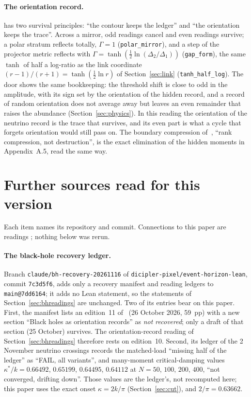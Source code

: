 \paragraph{The orientation record.} \cite{BH} has two survival principles: ``the contour keeps the ledger'' and ``the orientation keeps the trace''. Across a mirror, odd readings cancel and even readings survive; a polar stratum reflects totally, $\Gamma=1$ (\texttt{polar\_mirror}), and a step of the projector metric reflects with $\Gamma=\tanh(\tfrac12\ln(\Delta_2/\Delta_1))$ (\texttt{gap\_form}), the same $\tanh$ of half a log-ratio as the link coordinate $(r-1)/(r+1)=\tanh(\tfrac12\ln r)$ of Section~\ref{sec:link} (\texttt{tanh\_half\_log}). The door shows the same bookkeeping: the threshold shift is close to odd in the amplitude, with its sign set by the orientation of the hidden record, and a record of random orientation does not average away but leaves an even remainder that raises the abundance (Section~\ref{sec:physics}). In this reading the orientation of the neutrino record is the trace that survives, and its even part is what a cycle that forgets orientation would still pass on. The boundary compression of~\cite{BH}, ``rank compression, not destruction'', is the exact elimination of the hidden moments in Appendix~A.5, read the same way.

\section{Further sources read for this version}\label{sec:v11bsources}
Each item names its repository and commit. Connections to this paper are readings ; nothing below was rerun.

\paragraph{The black-hole recovery ledger.} Branch \texttt{claude/bh-recovery-20261116} of \texttt{dicipler-pixel/event-horizon-lean}, commit \texttt{7c3d5f6}, adds only a recovery manifest and reading ledgers to \texttt{main@7dd6164}; it adds no Lean statement, so the statements of Section~\ref{sec:bhreadings} are unchanged. Two of its entries bear on this paper. First, the manifest lists an edition~11 of~\cite{BH} (26 October 2026, 59~pp) with a new section ``Black holes as orientation records'' as \emph{not recovered}; only a draft of that section (25 October) survives. The orientation-record reading of Section~\ref{sec:bhreadings} therefore rests on edition~10. Second, its ledger of the 2 November neutrino crossings records the matched-load ``missing half of the ledger'' as ``FAIL, all variants'', and many-moment critical-damping values $\kappa^*/k=0.66492$, $0.65199$, $0.64495$, $0.64112$ at $N=50$, $100$, $200$, $400$, ``not converged, drifting down''. Those values are the ledger's, not recomputed here; this paper uses the exact onset $\kappa=2k/\pi$ (Section~\ref{sec:cut}), and $2/\pi=0.63662$.

